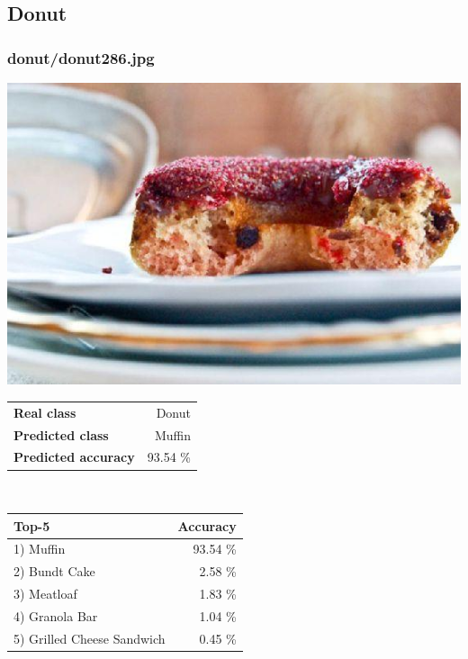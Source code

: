 \subsection{Donut}
    
\subsubsection{donut/donut286.jpg}

\begin{minipage}[t]{0.4\textwidth}
	\vspace{0pt}
	\includegraphics[width=\linewidth]{images/evaluation-images/donut/donut286.jpg}
\end{minipage}
\hfill
\begin{minipage}[t]{0.5\textwidth}
	\vspace{0pt}\raggedright
	\begin{tabularx}{\textwidth}{X r}
		\small \textbf{Real class} & \small Donut\\
		\small \textbf{Predicted class} & \small Muffin\\
		\small \textbf{Predicted accuracy} & \small 93.54 \%
    \end{tabularx}\\
    
    \vspace{6pt}
	\begin{tabularx}{\textwidth}{X r}
        \small \textbf{Top-5} & \small \textbf{Accuracy} \\
        \hline
		\small 1) Muffin & \small 93.54 \%\\\small 2) Bundt Cake & \small 2.58 \%\\\small 3) Meatloaf & \small 1.83 \%\\\small 4) Granola Bar & \small 1.04 \%\\\small 5) Grilled Cheese Sandwich & \small 0.45 \%
    \end{tabularx}
\end{minipage}
    
